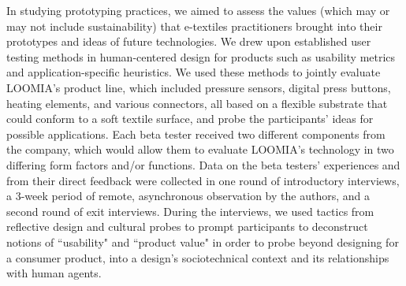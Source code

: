 In studying prototyping practices, we aimed to assess the values (which may or may not include sustainability) that e-textiles practitioners brought into their prototypes and ideas of future technologies.
We drew upon established user testing methods in human-centered design for products \cite{shneiderman_designing_2016, buley_user_2013} such as usability metrics and application-specific heuristics. %
We used these methods to jointly evaluate LOOMIA's product line, which included pressure sensors, digital press buttons, heating elements, and various connectors, all based on a flexible substrate that could conform to a soft textile surface, and probe the participants' ideas for possible applications. Each beta tester received two different components from the company, which would allow them to evaluate LOOMIA's technology in two differing form factors and/or functions. 
Data on the beta testers' experiences and from their direct feedback were collected in one round of introductory interviews, a 3-week period of remote, asynchronous observation by the authors, and a second round of exit interviews.  During the interviews, we used tactics from reflective design \cite{sengers_reflective_2005} and cultural probes \cite{boehner_how_2007} to prompt participants to deconstruct notions of ``usability" and ``product value" in order to probe beyond designing for a consumer product, into a design's sociotechnical context and its relationships with human agents. 


